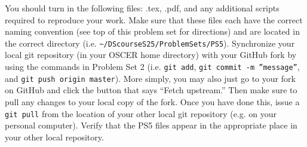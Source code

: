 \documentclass[12pt,english]{exam}
\begin{document}
\begin{questions}
\question You should turn in the following files: .tex, .pdf,  and any additional scripts required to reproduce your work.  Make sure that these files each have the correct naming convention (see top of this problem set for directions) and are located in the correct directory (i.e. \texttt{\textasciitilde/DScourseS25/ProblemSets/PS5}).
\question Synchronize your local git repository (in your OSCER home directory) with your GitHub fork by using the commands in Problem Set 2 (i.e. \texttt{git add}, \texttt{git commit -m ''message''}, and \texttt{git push origin master}). More simply, you may also just go to your fork on GitHub and click the button that says ``Fetch upstream.'' Then make sure to pull any changes to your local copy of the fork. Once you have done this, issue a \texttt{git pull} from the location of your other local git repository (e.g. on your personal computer). Verify that the PS5 files appear in the appropriate place in your other local repository.
\end{questions}
\end{document}
